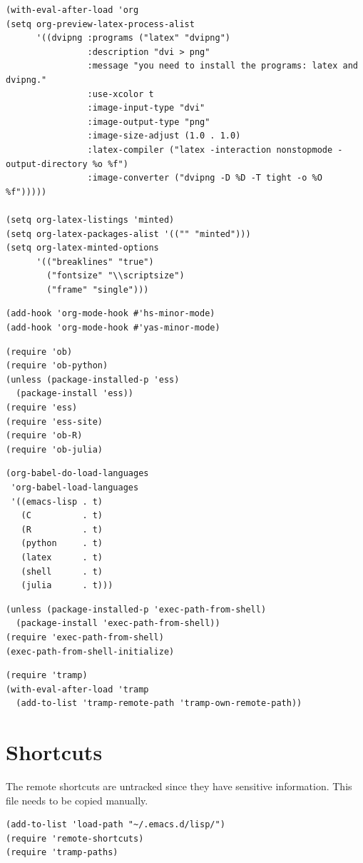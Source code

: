 \documentclass[11pt]{article}
\begin{document}
\begin{verbatim}
(with-eval-after-load 'org
(setq org-preview-latex-process-alist
      '((dvipng :programs ("latex" "dvipng")
                :description "dvi > png"
                :message "you need to install the programs: latex and dvipng."
                :use-xcolor t
                :image-input-type "dvi"
                :image-output-type "png"
                :image-size-adjust (1.0 . 1.0)
                :latex-compiler ("latex -interaction nonstopmode -output-directory %o %f")
                :image-converter ("dvipng -D %D -T tight -o %O %f")))))

(setq org-latex-listings 'minted)
(setq org-latex-packages-alist '(("" "minted")))
(setq org-latex-minted-options
      '(("breaklines" "true")
        ("fontsize" "\\scriptsize")
        ("frame" "single")))
\end{verbatim}
\begin{verbatim}
(add-hook 'org-mode-hook #'hs-minor-mode)
(add-hook 'org-mode-hook #'yas-minor-mode)
\end{verbatim}
\begin{verbatim}
(require 'ob)
(require 'ob-python)
(unless (package-installed-p 'ess)
  (package-install 'ess))
(require 'ess)
(require 'ess-site)
(require 'ob-R)
(require 'ob-julia)
\end{verbatim}
\begin{verbatim}
(org-babel-do-load-languages
 'org-babel-load-languages
 '((emacs-lisp . t)
   (C          . t)
   (R          . t)
   (python     . t)
   (latex      . t)
   (shell      . t)
   (julia      . t)))
\end{verbatim}
\begin{verbatim}
(unless (package-installed-p 'exec-path-from-shell)
  (package-install 'exec-path-from-shell))
(require 'exec-path-from-shell)
(exec-path-from-shell-initialize)
\end{verbatim}
\begin{verbatim}
(require 'tramp)
(with-eval-after-load 'tramp
  (add-to-list 'tramp-remote-path 'tramp-own-remote-path))
\end{verbatim}
\section{Shortcuts}
\label{sec:orgbf7d273}
The remote shortcuts are untracked since they have sensitive information. This file needs to be copied manually. 
\begin{verbatim}
(add-to-list 'load-path "~/.emacs.d/lisp/") 
(require 'remote-shortcuts)
(require 'tramp-paths)
\end{verbatim}
\end{document}
